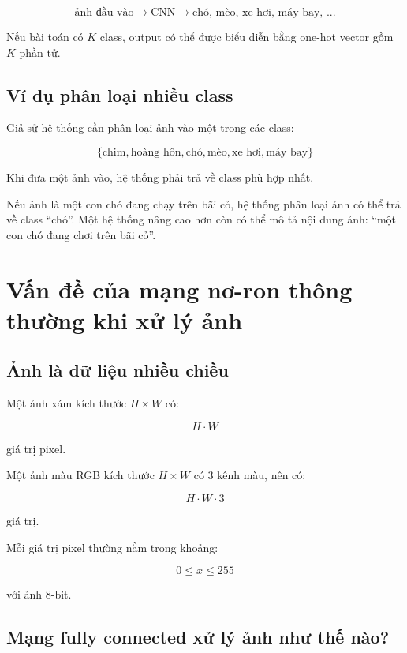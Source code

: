 \documentclass[12pt,a4paper]{report}
\begin{document}
\[
    \text{ảnh đầu vào}
    \rightarrow
    \text{CNN}
    \rightarrow
    \text{chó, mèo, xe hơi, máy bay, ...}
\]

Nếu bài toán có $K$ class, output có thể được biểu diễn bằng one-hot vector gồm $K$ phần tử.

\section{Ví dụ phân loại nhiều class}

Giả sử hệ thống cần phân loại ảnh vào một trong các class:

\[
    \{\text{chim}, \text{hoàng hôn}, \text{chó}, \text{mèo}, \text{xe hơi}, \text{máy bay}\}
\]

Khi đưa một ảnh vào, hệ thống phải trả về class phù hợp nhất.

\begin{vidu}
Nếu ảnh là một con chó đang chạy trên bãi cỏ, hệ thống phân loại ảnh có thể trả về class ``chó''. Một hệ thống nâng cao hơn còn có thể mô tả nội dung ảnh: ``một con chó đang chơi trên bãi cỏ''.
\end{vidu}

\chapter{Vấn đề của mạng nơ-ron thông thường khi xử lý ảnh}

\section{Ảnh là dữ liệu nhiều chiều}

Một ảnh xám kích thước $H \times W$ có:

\[
    H \cdot W
\]

giá trị pixel.

Một ảnh màu RGB kích thước $H \times W$ có 3 kênh màu, nên có:

\[
    H \cdot W \cdot 3
\]

giá trị.

Mỗi giá trị pixel thường nằm trong khoảng:

\[
    0 \leq x \leq 255
\]

với ảnh 8-bit.

\section{Mạng fully connected xử lý ảnh như thế nào?}
\end{document}
